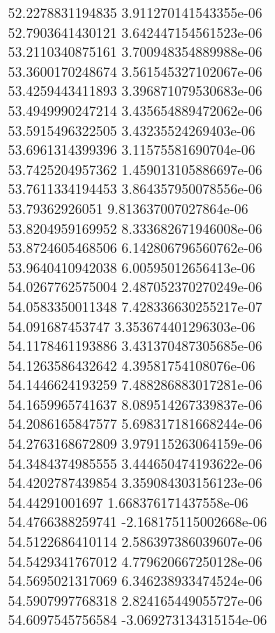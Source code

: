 {52.2278831194835 3.911270141543355e-06 \\
52.7903641430121 3.642447154561523e-06 \\
53.2110340875161 3.700948354889988e-06 \\
53.3600170248674 3.561545327102067e-06 \\
53.4259443411893 3.396871079530683e-06 \\
53.4949990247214 3.435654889472062e-06 \\
53.5915496322505 3.43235524269403e-06 \\
53.6961314399396 3.11575581690704e-06 \\
53.7425204957362 1.459013105886697e-06 \\
53.7611334194453 3.864357950078556e-06 \\
53.79362926051 9.813637007027864e-06 \\
53.8204959169952 8.333682671946008e-06 \\
53.8724605468506 6.142806796560762e-06 \\
53.9640410942038 6.00595012656413e-06 \\
54.0267762575004 2.487052370270249e-06 \\
54.0583350011348 7.428336630255217e-07 \\
54.091687453747 3.353674401296303e-06 \\
54.1178461193886 3.431370487305685e-06 \\
54.1263586432642 4.39581754108076e-06 \\
54.1446624193259 7.488286883017281e-06 \\
54.1659965741637 8.089514267339837e-06 \\
54.2086165847577 5.698317181668244e-06 \\
54.2763168672809 3.979115263064159e-06 \\
54.3484374985555 3.444650474193622e-06 \\
54.4202787439854 3.359084303156123e-06 \\
54.44291001697 1.668376171437558e-06 \\
54.4766388259741 -2.168175115002668e-06 \\
54.5122686410114 2.586397386039607e-06 \\
54.5429341767012 4.779620667250128e-06 \\
54.5695021317069 6.346238933474524e-06 \\
54.5907997768318 2.824165449055727e-06 \\
54.6097545756584 -3.069273134315154e-06 \\
}
